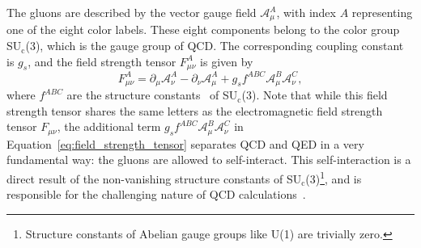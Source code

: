 The gluons are described by the vector gauge field $\mathcal{A}_\mu^A$, with index $A$ representing one of the eight color labels. These eight components belong to the color group SU$_\text{c}$(3), which is the gauge group of QCD. The corresponding coupling constant is $g_{s}$, and the field strength tensor $F_{\mu \nu}^A$ is given by
%
\begin{equation}
    \label{eq:field_strength_tensor}
    F_{\mu \nu}^A = \partial_\mu \mathcal{A}_\nu^A - \partial_\nu \mathcal{A}_\mu^A + g_s f^{ABC} \mathcal{A}_\mu^B \mathcal{A}_\nu^C,
\end{equation}
%
where $f^{ABC}$ are the structure constants~\cite{StructureConstants} of SU$_\text{c}$(3). Note that while this field strength tensor shares the same letters as the electromagnetic field strength tensor $F_{\mu \nu}$, the additional term $g_s f^{ABC} \mathcal{A}_\mu^B \mathcal{A}_\nu^C$ in Equation~\ref{eq:field_strength_tensor} separates QCD and QED in a very fundamental way: the gluons are allowed to self-interact. This self-interaction is a direct result of the non-vanishing structure constants of SU$_\text{c}$(3)\footnote{Structure constants of Abelian gauge groups like U(1) are trivially zero.}, and is responsible for the challenging nature of QCD calculations~\cite{QCDHistory}.

